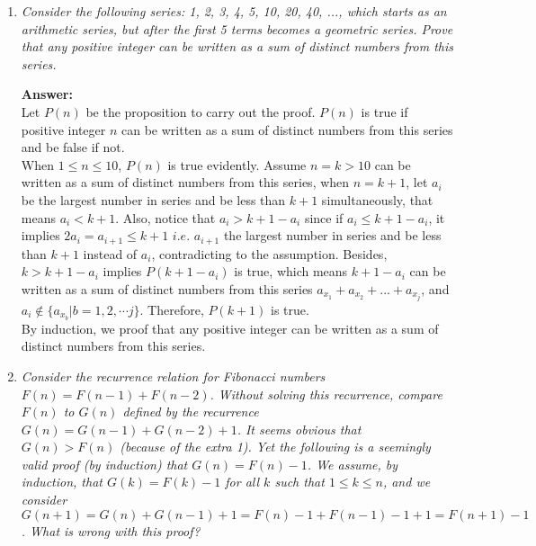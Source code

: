 \documentclass[a4paper,12pt]{article}
\begin{document}
\begin{enumerate}
\item{\it Consider the following series: 1, 2, 3, 4, 5, 10, 20, 40, ..., which starts as an arithmetic series, but after the first 5 terms becomes a geometric series. Prove that any positive integer can be written as a sum of distinct numbers from this series.}

\textbf{Answer:}\\
Let $P(n)$ be the proposition to carry out the proof. $P(n)$ is true if positive integer $n$ can be written as a sum of distinct numbers from this series and be false if not. \\
When $1\leq n \leq 10$, $P(n)$ is true evidently. Assume $n=k>10$ can be written as a sum of distinct numbers from this series, when $n=k+1$, let $a_i$ be the largest number in series and be less than $k+1$ simultaneously, that means $a_i < k+1$. Also, notice that $a_i > k+1-a_i$ since if $a_i \leq k+1-a_i$, it implies $2a_i = a_{i+1} \leq k+1$ $i.e.$ $a_{i+1}$ the largest number in series and be less than $k+1$ instead of $a_i$, contradicting to the assumption. Besides, $k>k+1-a_i$ implies $P(k+1-a_i)$ is true, which means $k+1-a_i$ can be written as a sum of distinct numbers from this series $a_{x_1}+a_{x_2}+...+a_{x_j}$, and $a_i \notin \{ a_{x_b} | b=1,2,\cdots j \}$. Therefore, $P(k+1)$ is true.\\
By induction, we proof that any positive integer can be written as a sum of distinct numbers from this series.



\item {\it Consider the recurrence relation for Fibonacci numbers $F(n) = F(n-1)+F(n-2)$. Without solving this recurrence, compare $F(n)$ to $G(n)$ defined by the recurrence $G(n) = G(n-1)+G(n-2)+1$. It seems obvious that $G(n) > F(n)$ (because of the extra 1). Yet the following is a seemingly valid proof (by induction) that $G(n) = F (n) - 1$. We assume, by induction, that $G(k) = F(k)-1$ for all $k$ such that $1\leq k \leq n$, and we consider $G(n + 1) = G(n) + G(n - 1) + 1 = F (n) - 1 + F (n - 1) - 1 + 1 = F (n + 1) - 1$. What is wrong with this proof?}


\end{enumerate}
\end{document}
